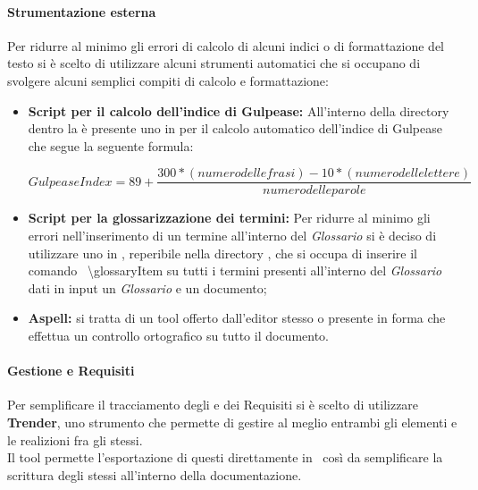       \paragraph{Strumentazione esterna}
        Per ridurre al minimo gli errori di calcolo di alcuni indici o di formattazione del testo si è scelto di utilizzare alcuni strumenti
        automatici che si occupano di svolgere alcuni semplici compiti di calcolo e formattazione:
        \begin{itemize}
          \item \textbf{Script  per il calcolo dell'indice di Gulpease: }All'interno della directory  dentro la  è presente
          uno  in  per il calcolo automatico dell'indice di Gulpease che segue la seguente formula:
          \begin{center}
            \begin{equation}
              Gulpease Index = 89+\frac{300*( numero delle frasi ) - 10*( numero delle lettere )}{numero delle parole}
            \end{equation}
          \end{center}
          \item \textbf{Script  per la glossarizzazione dei termini: }Per ridurre al minimo gli errori nell'inserimento di un termine all'interno
          del \emph{Glossario} si è deciso di utilizzare uno  in , reperibile nella directory , che si occupa di inserire
          il comando \glossaryItem{\LaTeX}\ \textbackslash glossaryItem{} su tutti i termini presenti all'interno del \emph{Glossario} dati in input un \emph{Glossario}
          e un documento;
          \item \textbf{Aspell: }si tratta di un tool offerto dall'editor stesso o presente in forma  che effettua un controllo ortografico
          su tutto il documento.
        \end{itemize}
      \paragraph{Gestione  e Requisiti}
        Per semplificare il tracciamento degli  e dei Requisiti si è scelto di utilizzare \textbf{Trender}, uno strumento  che permette
        di gestire al meglio entrambi gli elementi e le realizioni fra gli stessi.\\
        Il tool permette l'esportazione di questi direttamente in \glossaryItem{\LaTeX}\, così da semplificare la scrittura degli stessi all'interno della documentazione.
